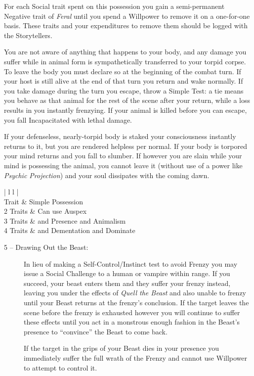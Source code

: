 \begin{description}
	For each Social trait spent on this possession you gain a semi-permanent Negative 
	trait of \emph{Feral} until you spend a Willpower to remove it on a one-for-one basis.  
	These traits and your expenditures to remove them should be logged with the Storytellers.
	
	You are not aware of anything that happens to your body, and any damage you suffer while 
	in animal form is sympathetically transferred to your torpid corpse.  To leave the body 
	you must declare so at the beginning of the combat turn.  If your host is still alive at 
	the end of that turn you return and wake normally.  If you take damage during the 
	turn you escape, throw a Simple Test:  a tie means you behave as that animal for 
	the rest of the scene after your return, while a loss results in you instantly frenzying.  
	If your animal is killed before you can escape, you fall Incapacitated with lethal damage.  
	
	If your defenseless, nearly-torpid body is staked your consciousness instantly returns to it, 
	but you are rendered helpless per normal.  If your body is torpored your mind returns and you 
	fall to slumber.  If however you are slain while your mind is possessing the animal, you cannot 
	leave it (without use of a power like \emph{Psychic Projection}) and your soul dissipates with 
	the coming dawn.
\end{description}

\begin{center}
\begin{tabular}{ | l l |}
	\hline
	 \\
	 Trait & Simple Possession \\
	2 Traits & Can use Auspex \\
	3 Traits & and Presence and Animalism \\
	4 Traits & and Dementation and Dominate \\
	\hline
\end{tabular}
\end{center}

\begin{description}
	\item[5 -- Drawing Out the Beast:]  In lieu of making a Self-Control/Instinct test to avoid 
	Frenzy you may issue a Social Challenge to a human or vampire within range.  If you succeed, 
	your beast enters them and they suffer your frenzy instead, leaving you under the effects of 
	\emph{Quell the Beast} and also unable to frenzy until your Beast returns at the frenzy's 
	conclusion.  If the target leaves the scene before the frenzy is exhausted however you will 
	continue to suffer these effects until you act in a monstrous enough fashion in the Beast's 
	presence to ``convince'' the Beast to come back.
	
	If the target in the grips of your Beast dies in your presence you immediately suffer the full 
	wrath of the Frenzy and cannot use Willpower to attempt to control it.
\end{description}

